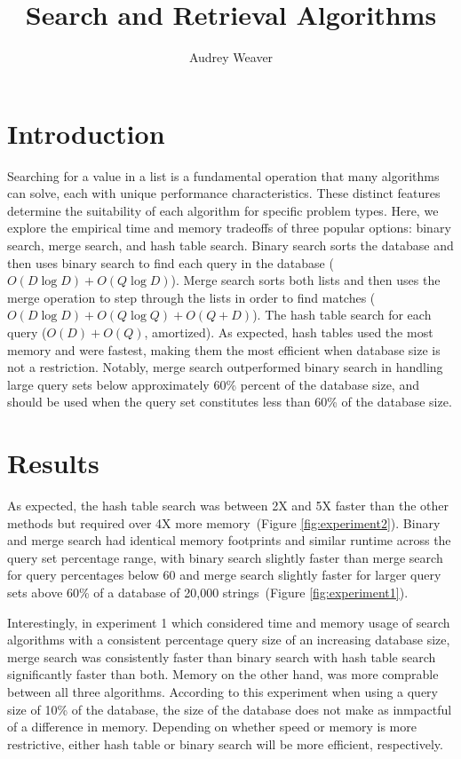 \documentclass[11pt, letterpaper]{article}
\begin{document}
\title{Search and Retrieval Algorithms}
\author{Audrey Weaver}
\maketitle

\section{Introduction}

Searching for a value in a list is a fundamental operation that many
algorithms can solve, each with unique performance characteristics.  These
distinct features determine the suitability of each algorithm for specific
problem types.  Here, we explore the empirical time and memory tradeoffs of
three popular options: binary search, merge search, and hash table search.
Binary search sorts the database and then uses binary search to find each
query in the database ($O(D \log D) + O(Q \log D)$). Merge search sorts both
lists and then uses the merge operation to step through the lists in order to
find matches ($O(D \log D) + O(Q \log Q) + O(Q + D)$). The hash table search
for each query ($O(D) + O(Q)$, amortized). As expected, hash tables used the 
most memory and were fastest, making them the most efficient when database 
size is not a restriction. Notably, merge search outperformed binary search 
in handling large query sets below approximately 60\% percent of the database size, and 
should be used when the query set constitutes less than 60\% of the database 
size.

\section{Results}

As expected, the hash table search was between 2X and 5X faster than the
other methods but required over 4X more memory~(Figure \ref{fig:experiment2}).
Binary and merge search had identical memory footprints and similar runtime
across the query set percentage range, with binary search slightly faster than
merge search for query percentages below 60 and merge search slightly faster 
for larger query sets above 60\% of a database of 20,000 strings~(Figure \ref{fig:experiment1}).

Interestingly, in experiment 1 which considered time and memory usage of 
search algorithms with a consistent percentage query size of an increasing 
database size, merge search was consistently faster than binary search with 
hash table search significantly faster than both. Memory on the other hand,
was more comprable between all three algorithms. According to this experiment
when using a query size of 10\% of the database, the size of the database does 
not make as inmpactful of a difference in memory. Depending on whether speed 
or memory is more restrictive, either hash table or binary search will be more 
efficient, respectively.
\end{document}
